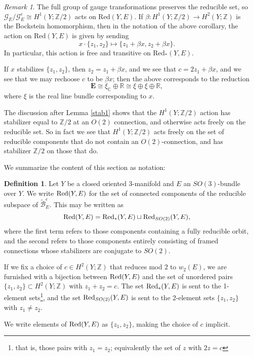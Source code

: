 \documentclass[10pt,a4paper]{amsart}
\theoremstyle{definition}
\newtheorem{definition}[theorem]{Definition}
\theoremstyle{remark}
\newtheorem{remark}[theorem]{Remark}
\numberwithin{figure}{qchap}
\begin{document}
\begin{remark}\label{H1action} The full group of gauge transformations preserves the reducible set, so $\mathcal G_E/\mathcal G^e_E \cong H^1(Y;\mathbb Z/2)$ acts on $\text{Red}(Y,E)$. If $\beta: H^1(Y;\mathbb Z/2) \to H^2(Y;\mathbb Z)$ is the Bockstein homomorphism, then in the notation of the above corollary, the action on $\text{Red}(Y,E)$ is given by sending $$x \cdot \{z_1, z_2\} \mapsto \{z_1 + \beta x, z_2 + \beta x\}.$$ In particular, this action is free and transitive on $\text{Red}_*(Y,E)$. 

If $x$ stabilizes $\{z_1, z_2\}$, then $z_2 = z_1 + \beta x$, and we see that $c = 2z_1 + \beta x$, and we see that we may rechoose $c$ to be $\beta x$; then the above corresponds to the reduction $$\mathbf{E} \cong \xi_{\mathbb C} \oplus \mathbb R \cong \xi \oplus \xi \oplus \mathbb R,$$ where $\xi$ is the real line bundle corresponding to $x$. 

The discussion after Lemma \ref{stab1} shows that the $H^1(Y;\mathbb Z/2)$ action has stabilizer equal to $\mathbb Z/2$ at an $O(2)$ connection, and otherwise acts freely on the reducible set. So in fact we see that $H^1(Y;\mathbb Z/2)$ acts freely on the set of reducible components that do not contain an $O(2)$-connection, and has stabilizer $\mathbb Z/2$ on those that do.
\end{remark}

We summarize the content of this section as notation: 

\begin{definition}\label{red-def}Let $Y$ be a closed oriented 3-manifold and $E$ an $SO(3)$-bundle over $Y$. We write $\textup{Red}(Y,E)$ for the set of connected components of the reducible subspace of $\widetilde{\mathcal B}^e_E$. This may be written as $$\textup{Red}(Y,E) = \textup{Red}_{*}(Y,E) \sqcup \textup{Red}_{SO(2)}(Y, E),$$ where the first term refers to those components containing a fully reducible orbit, and the second refers to those components entirely consisting of framed connections whose stabilizers are conjugate to $SO(2)$. 

If we fix a choice of $c \in H^2(Y;\mathbb Z)$ that reduces mod $2$ to $w_2(E)$, we are furnished with a bijection between $\textup{Red}(Y,E)$ and the set of unordered pairs $\{z_1, z_2\} \subset H^2(Y;\mathbb Z)$ with $z_1 + z_2 = c$. The set $\textup{Red}_*(Y,E)$ is sent to the 1-element sets\footnote{that is, those pairs with $z_1 = z_2$; equivalently the set of $z$ with $2z = c$}, and the set $\textup{Red}_{SO(2)}(Y,E)$ is sent to the 2-element sets $\{z_1, z_2\}$ with $z_1 \neq z_2$.

We write elements of $\textup{Red}(Y,E)$ as $\{z_1, z_2\}$, making the choice of $c$ implicit.
\end{definition}
\end{document}
